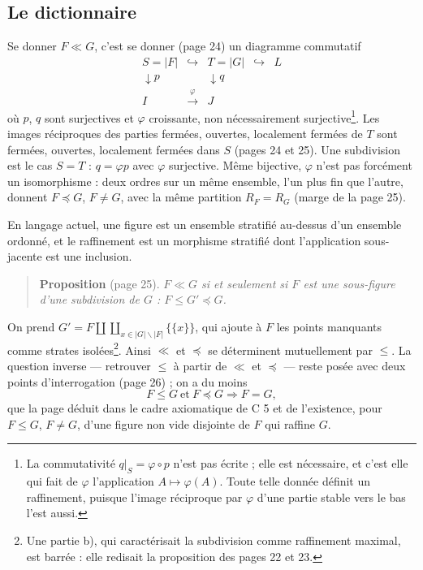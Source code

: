 \documentclass[11pt,a4paper]{article}
\begin{document}
\subsection*{Le dictionnaire}

Se donner $F \ll G$, c'est se donner (page 24) un diagramme commutatif
\[
\begin{array}{ccccc}
S = |F| & \hookrightarrow & T = |G| & \hookrightarrow & L \\
\downarrow p & & \downarrow q & & \\
I & \xrightarrow{\ \varphi\ } & J & &
\end{array}
\]
où $p$, $q$ sont surjectives et $\varphi$ croissante, non nécessairement
surjective\footnote{La commutativité $q|_{S} = \varphi \circ p$ n'est pas écrite ;
elle est nécessaire, et c'est elle qui fait de $\varphi$ l'application $A \mapsto
\varphi(A)$. Toute telle donnée définit un raffinement, puisque l'image
réciproque par $\varphi$ d'une partie stable vers le bas l'est aussi.}. Les
images réciproques des parties fermées, ouvertes, localement fermées de $T$
sont fermées, ouvertes, localement fermées dans $S$ (pages 24 et 25). Une
subdivision est le cas $S = T$ : $q = \varphi p$ avec $\varphi$ surjective.
Même bijective, $\varphi$ n'est pas forcément un isomorphisme : deux ordres sur
un même ensemble, l'un plus fin que l'autre, donnent $F \preccurlyeq G$, $F \neq
G$, avec la même partition $R_{F} = R_{G}$ (marge de la page 25).

En langage actuel, une figure est un ensemble stratifié au-dessus d'un ensemble
ordonné, et le raffinement est un morphisme stratifié dont l'application
sous-jacente est une inclusion.

\begin{quote}
\textbf{Proposition} (page 25). \emph{$F \ll G$ si et seulement si $F$ est une
sous-figure d'une subdivision de $G$ : $F \leq G' \preccurlyeq G$.}
\end{quote}

On prend $G' = F \amalg \coprod_{x \in |G| \smallsetminus |F|} \{\{x\}\}$, qui
ajoute à $F$ les points manquants comme strates isolées\footnote{Une partie b),
qui caractérisait la subdivision comme raffinement maximal, est barrée : elle
redisait la proposition des pages 22 et 23.}. Ainsi $\ll$ et $\preccurlyeq$ se
déterminent mutuellement par $\leq$. La question inverse --- retrouver $\leq$ à
partir de $\ll$ et $\preccurlyeq$ --- reste posée avec deux points
d'interrogation (page 26) ; on a du moins
\[
F \leq G \ \text{et}\ F \preccurlyeq G \Longrightarrow F = G,
\]
que la page déduit dans le cadre axiomatique de C 5 et de l'existence, pour $F
\leq G$, $F \neq G$, d'une figure non vide disjointe de $F$ qui raffine $G$.
\end{document}

